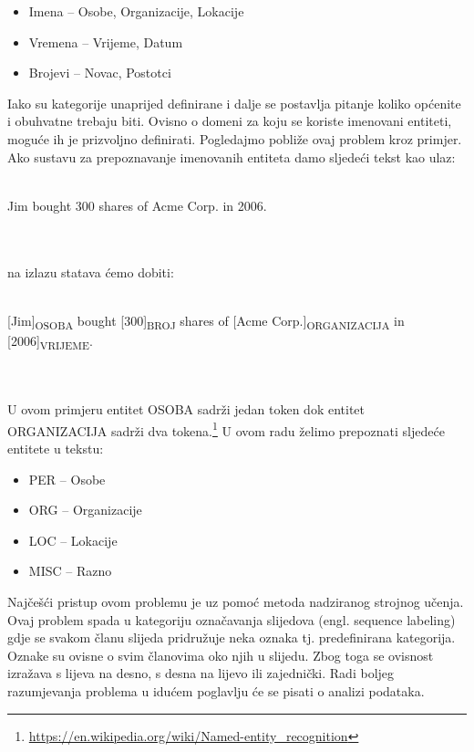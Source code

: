 \documentclass[times, utf8, seminar]{fer}
\begin{document}
\begin{itemize}
	\item Imena -- Osobe, Organizacije, Lokacije
	\item Vremena -- Vrijeme, Datum
	\item Brojevi -- Novac, Postotci
\end{itemize}

Iako su kategorije unaprijed definirane i dalje se postavlja pitanje koliko općenite i obuhvatne trebaju biti. Ovisno o domeni za koju se koriste imenovani entiteti, moguće ih je prizvoljno definirati. Pogledajmo pobliže ovaj problem kroz primjer. Ako sustavu za prepoznavanje imenovanih entiteta damo sljedeći tekst kao ulaz: \\\\
\centerline{Jim  bought 300 shares of Acme Corp. in 2006.}\\\\
na izlazu statava ćemo dobiti:\\\\
\centerline{[Jim]\textsubscript{OSOBA} bought [300]\textsubscript{BROJ} shares of [Acme Corp.]\textsubscript{ORGANIZACIJA} in [2006]\textsubscript{VRIJEME}.}\\\\
U ovom primjeru entitet OSOBA sadrži jedan token dok entitet ORGANIZACIJA sadrži dva tokena.\footnote{\url{https://en.wikipedia.org/wiki/Named-entity_recognition}} U ovom radu želimo prepoznati sljedeće entitete u tekstu:

\begin{itemize}
	\item PER -- Osobe
	\item ORG -- Organizacije
	\item LOC -- Lokacije
	\item MISC -- Razno
\end{itemize}

\newpage 

Najčešći pristup ovom problemu je uz pomoć metoda nadziranog strojnog učenja. Ovaj problem spada u kategoriju označavanja slijedova (engl. sequence labeling) gdje se svakom članu slijeda pridružuje neka oznaka tj. predefinirana kategorija. Oznake su ovisne o svim članovima oko njih u slijedu. Zbog toga se ovisnost izražava s lijeva na desno, s desna na lijevo ili zajednički. Radi boljeg razumjevanja problema u idućem poglavlju će se pisati o analizi podataka.
\end{document}
